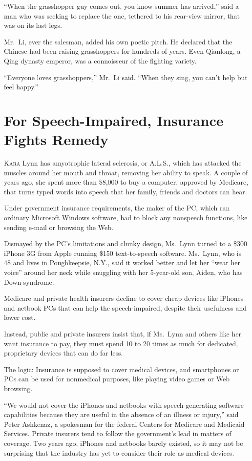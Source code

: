 ﻿\documentclass[12pt]{article}
\begin{document}
``When the grasshopper guy comes out, you know summer has arrived,'' said a man who was seeking to
replace the one, tethered to his rear-view mirror, that was on its last legs.

Mr.~Li, ever the salesman, added his own poetic pitch. He declared that the Chinese had been raising
grasshoppers for hundreds of years. Even Qianlong, a Qing dynasty emperor, was a connoisseur of the
fighting variety.

``Everyone loves grasshoppers,'' Mr.~Li said. ``When they sing, you can't help but feel happy.''

\section{For Speech-Impaired, Insurance Fights Remedy}

\lettrine{K}{ara} Lynn has amyotrophic lateral sclerosis, or A.L.S., which has attacked the muscles
around her mouth and throat, removing her ability to speak. A couple of years ago, she spent more
than \$8,000 to buy a computer, approved by Medicare, that turns typed words into speech that her
family, friends and doctors can hear.

Under government insurance requirements, the maker of the PC, which ran ordinary Microsoft Windows
software, had to block any nonspeech functions, like sending e-mail or browsing the Web.

Dismayed by the PC's limitations and clunky design, Ms.~Lynn turned to a \$300 iPhone 3G from Apple
running \$150 text-to-speech software. Ms.~Lynn, who is 48 and lives in Poughkeepsie, N.Y., said it
worked better and let her ``wear her voice'' around her neck while snuggling with her 5-year-old
son, Aiden, who has Down syndrome.

Medicare and private health insurers decline to cover cheap devices like iPhones and netbook PCs
that can help the speech-impaired, despite their usefulness and lower cost.

Instead, public and private insurers insist that, if Ms.~Lynn and others like her want insurance to
pay, they must spend 10 to 20 times as much for dedicated, proprietary devices that can do far less.

The logic: Insurance is supposed to cover medical devices, and smartphones or PCs can be used for
nonmedical purposes, like playing video games or Web browsing.

``We would not cover the iPhones and netbooks with speech-generating software capabilities because
they are useful in the absence of an illness or injury,'' said Peter Ashkenaz, a spokesman for the
federal Centers for Medicare and Medicaid Services. Private insurers tend to follow the government's
lead in matters of coverage. Two years ago, iPhones and netbooks barely existed, so it may not be
surprising that the industry has yet to consider their role as medical devices.
\end{document}

